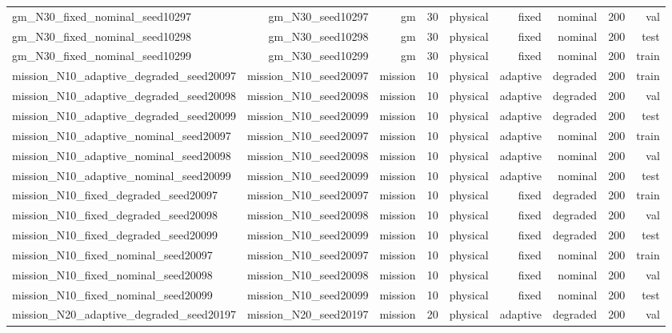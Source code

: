 \begin{tabular}{lrrrrrrrr}
gm\_N30\_fixed\_nominal\_seed10297 & gm\_N30\_seed10297 & gm & 30 & physical & fixed & nominal & 200 & val \\
gm\_N30\_fixed\_nominal\_seed10298 & gm\_N30\_seed10298 & gm & 30 & physical & fixed & nominal & 200 & test \\
gm\_N30\_fixed\_nominal\_seed10299 & gm\_N30\_seed10299 & gm & 30 & physical & fixed & nominal & 200 & train \\
mission\_N10\_adaptive\_degraded\_seed20097 & mission\_N10\_seed20097 & mission & 10 & physical & adaptive & degraded & 200 & train \\
mission\_N10\_adaptive\_degraded\_seed20098 & mission\_N10\_seed20098 & mission & 10 & physical & adaptive & degraded & 200 & val \\
mission\_N10\_adaptive\_degraded\_seed20099 & mission\_N10\_seed20099 & mission & 10 & physical & adaptive & degraded & 200 & test \\
mission\_N10\_adaptive\_nominal\_seed20097 & mission\_N10\_seed20097 & mission & 10 & physical & adaptive & nominal & 200 & train \\
mission\_N10\_adaptive\_nominal\_seed20098 & mission\_N10\_seed20098 & mission & 10 & physical & adaptive & nominal & 200 & val \\
mission\_N10\_adaptive\_nominal\_seed20099 & mission\_N10\_seed20099 & mission & 10 & physical & adaptive & nominal & 200 & test \\
mission\_N10\_fixed\_degraded\_seed20097 & mission\_N10\_seed20097 & mission & 10 & physical & fixed & degraded & 200 & train \\
mission\_N10\_fixed\_degraded\_seed20098 & mission\_N10\_seed20098 & mission & 10 & physical & fixed & degraded & 200 & val \\
mission\_N10\_fixed\_degraded\_seed20099 & mission\_N10\_seed20099 & mission & 10 & physical & fixed & degraded & 200 & test \\
mission\_N10\_fixed\_nominal\_seed20097 & mission\_N10\_seed20097 & mission & 10 & physical & fixed & nominal & 200 & train \\
mission\_N10\_fixed\_nominal\_seed20098 & mission\_N10\_seed20098 & mission & 10 & physical & fixed & nominal & 200 & val \\
mission\_N10\_fixed\_nominal\_seed20099 & mission\_N10\_seed20099 & mission & 10 & physical & fixed & nominal & 200 & test \\
mission\_N20\_adaptive\_degraded\_seed20197 & mission\_N20\_seed20197 & mission & 20 & physical & adaptive & degraded & 200 & val \\

\end{tabular}
